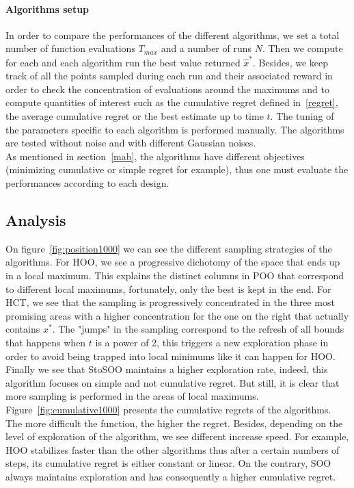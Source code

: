 \documentclass[a4paper,10pt]{article}
\begin{document}
\paragraph{Algorithms setup}
In order to compare the performances of the different algorithms, we set a total number of function evaluations $T_{max}$ and a number of runs $N$. Then we compute for each and each algorithm run the best value returned $\widehat{x}^*$. Besides, we keep track of all the points sampled during each run and their associated reward in order to check the concentration of evaluations around the maximums and to compute quantities of interest such as the cumulative regret defined in~\ref{regret}, the average cumulative regret or the best estimate up to time $t$. The tuning of the parameters specific to each algorithm is performed manually. The algorithms are tested without noise and with different Gaussian noises.\\
As mentioned in section~\ref{mab}, the algorithms have different objectives (minimizing cumulative or simple regret for example), thus one must evaluate the performances according to each design.



\subsection{Analysis}
On figure~\ref{fig:position1000} we can see the different sampling strategies of the algorithms. For HOO, we see a progressive dichotomy of the space that ends up in a local maximum. This explains the distinct columns in POO that correspond to different local maximums, fortunately, only the best is kept in the end. For HCT, we see that the sampling is progressively concentrated in the three most promising areas with a higher concentration for the one on the right that actually contains $x^*$. The "jumps" in the sampling correspond to the refresh of all bounds that happens when $t$ is a power of 2, this triggers a new exploration phase in order to avoid being trapped into local minimums like it can happen for HOO. Finally we see that StoSOO maintains a higher exploration rate, indeed, this algorithm focuses on simple and not cumulative regret. But still, it is clear that more sampling is performed in the areas of local maximums.\\

Figure~\ref{fig:cumulative1000} presents the cumulative regrets of the algorithms. The more difficult the function, the higher the regret. Besides, depending on the level of exploration of the algorithm, we see different increase speed. For example, HOO stabilizes faster than the other algorithms thus after a certain numbers of steps, its cumulative regret is either constant or linear. On the contrary, SOO always maintains exploration and has consequently a higher cumulative regret.\\
\end{document}
